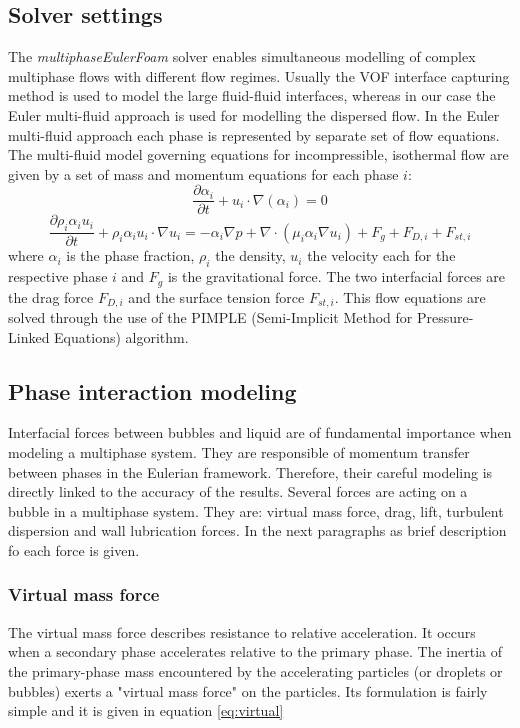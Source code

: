 \documentclass[11pt,a4paper]{article}
\begin{document}
\subsection{Solver settings}
\label{sub:solver}
The \textit{multiphaseEulerFoam} solver enables simultaneous modelling of complex multiphase flows with different flow regimes. Usually the VOF interface capturing method is used to model the large fluid-fluid interfaces, whereas in our case the Euler multi-fluid approach is used for modelling the dispersed flow. In the Euler multi-fluid approach each phase is represented by separate set of flow equations. The multi-fluid model governing equations for incompressible, isothermal flow are given by a set of mass and momentum equations for each phase $i$:
\begin{equation}
    \frac{\partial \alpha_i}{\partial t}+u_i\cdot \nabla (\alpha_i)=0
\end{equation}
\begin{equation}
    \frac{\partial \rho_i\alpha_iu_i}{\partial t}+\rho_i\alpha_iu_i\cdot \nabla u_i=-\alpha_i\nabla p+\nabla \cdot (\mu_i\alpha_i\nabla u_i)+F_g+F_{D,i}+F_{st,i}
\end{equation}
where $\alpha_i$ is the phase fraction, $\rho_i$ the density, $u_i$ the velocity each for the respective phase $i$ and $F_g$ is the gravitational force. The two interfacial forces are the drag force $F_{D,i}$ and the surface tension force $F_{st,i}$. This flow equations are solved through the use of the PIMPLE (Semi-Implicit Method for Pressure-Linked Equations) algorithm. 



\subsection{Phase interaction modeling}
\label{sub:forces}

Interfacial forces between bubbles and liquid are of fundamental importance when modeling a multiphase system. They are responsible of momentum transfer between phases in the Eulerian framework. Therefore, their careful modeling is directly linked to the accuracy of the results. Several forces are acting on a bubble in a multiphase system. They are:  virtual mass force, drag, lift, turbulent dispersion and wall lubrication forces. In the next paragraphs as brief description fo each force is given.


\subsubsection{Virtual mass force}
The virtual mass force describes resistance to relative acceleration. It occurs when a secondary phase accelerates relative to the primary phase. The inertia of the primary-phase mass encountered by the accelerating particles (or droplets or bubbles) exerts a "virtual mass force" on the particles. Its formulation is fairly simple and it is given in equation \ref{eq:virtual}
\end{document}
